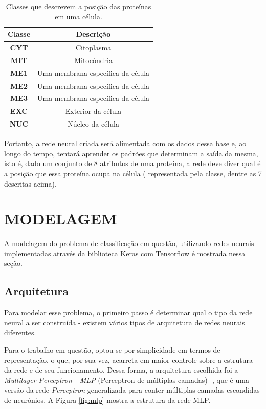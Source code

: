 \documentclass[12pt]{article}
\begin{document}
\begin{table}[h]
	\centering
	\begin{tabular}{|c|c|}
		\hline
		\textbf{Classe} & \textbf{Descrição} \\ \hline
		\textbf{CYT} & Citoplasma \\ \hline
		\textbf{MIT} & Mitocôndria \\ \hline
		\textbf{ME1} & Uma membrana específica da célula \\ \hline
		\textbf{ME2} & Uma membrana específica da célula \\ \hline
		\textbf{ME3} & Uma membrana específica da célula \\ \hline
		\textbf{EXC} & Exterior da célula \\ \hline
		\textbf{NUC} & Núcleo da célula \\ \hline
	\end{tabular}
	\caption{\label{tab:classes} Classes que descrevem a posição
	das proteínas em uma célula.}
\end{table}

Portanto, a rede neural criada será alimentada com os dados dessa base e,
ao longo do tempo, tentará aprender os padrões que determinam a saída
da mesma, isto é, dado um conjunto de 8 atributos de uma proteína, a
rede deve dizer qual é a posição que essa proteína ocupa na célula (
representada pela classe, dentre as 7 descritas acima).

\section{MODELAGEM}

A modelagem do problema de classificação em questão, utilizando redes
neurais implementadas através da biblioteca Keras com Tensorflow é 
mostrada nessa seção.

\subsection{Arquitetura}

Para modelar esse problema, o primeiro passo é determinar qual o tipo
da rede neural a ser construída - existem vários tipos de arquitetura
de redes neurais diferentes.

Para o trabalho em questão, optou-se por simplicidade em termos de
representação, o que, por sua vez, acarreta em maior controle sobre 
a estrutura da rede e de seu funcionamento. Dessa forma, a arquitetura
escolhida foi a \textit{Multilayer Perceptron - MLP} (Perceptron de
múltiplas camadas) -, que é uma versão da rede \textit{Perceptron} 
generalizada para conter múltiplas camadas escondidas de neurônios.
A Figura \ref{fig:mlp} mostra a estrutura da rede MLP.
\end{document}
